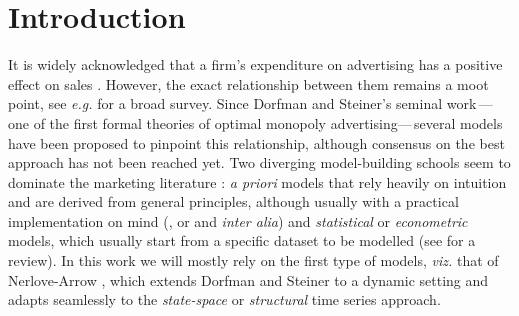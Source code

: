 
\section{Introduction}

It is widely acknowledged that a firm's expenditure  on advertising has a positive effect on sales \cite{assmus1984advertising, tellis2007advertising, luo2012does, wiesel2011practice}. However, the exact relationship between them remains a moot point, see \emph{e.g.} \cite{tellis2009generalizations} for a broad survey. Since Dorfman and Steiner's \cite{dorfman1954optimal} seminal work\,---one of the first formal theories of optimal monopoly advertising---\,several models have been proposed to pinpoint this relationship, although consensus on the best approach has not been reached yet. Two diverging model-building schools seem to dominate the marketing literature \cite{little1979aggregate}: \emph{a priori} models that rely heavily on intuition and are derived from general principles, although usually with a practical implementation on mind (\cite{nerlove1962optimal}, or \cite{vidale1957operations} and \cite{little1975brandaid} \emph{inter alia}) and  \emph{statistical} or \emph{econometric} models, which usually start from a specific dataset to be modelled (see \cite{assmus1984advertising} for a review). In this work we will mostly rely on the first type of models, \emph{viz.} that of Nerlove-Arrow \cite{nerlove1962optimal}, which extends  Dorfman and Steiner to a dynamic setting \cite{bagwell2007economic} and adapts seamlessly to the \emph{state-space} or \emph{structural} time series approach.



